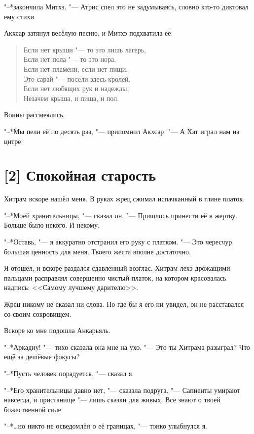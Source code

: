 "--*закончила Митхэ.
"--- Атрис спел это не задумываясь, словно кто-то диктовал ему стихи\ldotst

Акхсар затянул весёлую песню, и Митхэ подхватила её:

\begin{verse}
Если нет крыши "--- то это лишь лагерь,\\
Если нет пола "--- то это нора,\\
Если нет пламени, если нет пищи,\\
Это сарай "--- посели здесь кролей.\\
Если нет любящих рук и надежды,\\
Незачем крыша, и пища, и пол.
\end{verse}

Воины рассмеялись.

"--*Мы пели её по десять раз, "--- припомнил Акхсар.
"--- А Хат играл нам на цитре.

\section{[2] Спокойная старость}

Хитрам вскоре нашёл меня.
В руках жрец сжимал испачканный в глине платок.

"--*Моей хранительницы, "--- сказал он.
"--- Пришлось принести её в жертву.
Больше было некого.
И некому.

"--*Оставь, "--- я аккуратно отстранил его руку с платком.
"--- Это чересчур большая ценность для меня.
Твоего жеста вполне достаточно.

Я отошёл, и вскоре раздался сдавленный возглас.
Хитрам-лехэ дрожащими пальцами расправлял совершенно чистый платок, на котором красовалась надпись: <<Самому лучшему дарителю>>.

Жрец никому не сказал ни слова.
Но где бы я его ни увидел, он не расставался со своим сокровищем.

Вскоре ко мне подошла Анкарьяль.

"--*Аркадиу! "--- тихо сказала она мне на ухо.
"--- Это ты Хитрама разыграл?
Что ещё за дешёвые фокусы?

"--*Пусть человек порадуется, "--- сказал я.

"--*Его хранительницы давно нет, "--- сказала подруга.
"--- Сапиенты умирают навсегда, и пристанище "--- лишь сказки для живых.
Все знают о твоей божественной силе\ldotst

"--*\ldots но никто не осведомлён о её границах, "--- тонко улыбнулся я.

